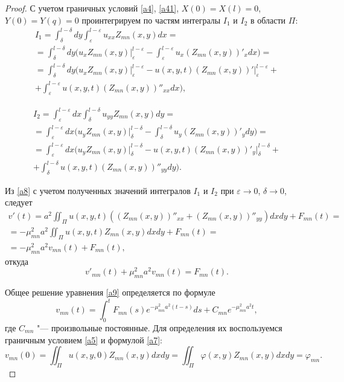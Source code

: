 \begin{proof}
С учетом граничных условий \eqref{a4}, \eqref{a41}, $X(0)=X(l)=0$, $Y(0)=Y(q)=0$ проинтегрируем по частям интегралы $I_1$ и $I_2$ в области $\Pi$:
\begin{multline}
I_{1}=\int_{\delta}^{l-\delta}dy\int_{\varepsilon}^{l-\varepsilon} u_{xx}Z_{mn}(x,y)dx= 
\\
=
\int_{\delta}^{l-\delta} dy\biggl(u_x Z_{mn}(x,y)\big|_{\varepsilon}^{l-\varepsilon}-
\int_{\varepsilon}^{l-\varepsilon}u_x\left(Z_{mn}(x,y)\right)'_x dx\biggr)=
\\
=\int_{\delta}^{l-\delta} dy\biggl(u_x Z_{mn}(x,y)\big|_{\varepsilon}^{l-\varepsilon}-u(x,y,t) \left(Z_{mn}(x,y)\right)'\big|_{\varepsilon}^{l-\varepsilon}+
\\
+ \int_{\varepsilon}^{l-\varepsilon}u(x,y,t)\left(Z_{mn}(x,y)\right)''_{xx} dx\biggr),
\end{multline}

\begin{multline}
I_{2}=\int_{\varepsilon}^{l-\varepsilon}dx\int_{\delta}^{l-\delta} u_{yy} Z_{mn}(x,y)dy= 
\\
=
\int_{\varepsilon}^{l-\varepsilon} dx\biggl(u_y Z_{mn}(x,y)\big|_{\delta}^{l-\delta}-
\int_{\delta}^{l-\delta} u_y\left(Z_{mn}(x,y)\right)'_{y} dy\biggr)  =
\\
=\int_{\varepsilon}^{l-\varepsilon} dx\biggl(u_y Z_{mn}(x,y)\big|_{\delta}^{l-\delta}-
u(x,y,t)\left(Z_{mn}(x,y)\right)'_{y} \big|_{\delta}^{l-\delta}+
\\
+
\int_{\delta}^{l-\delta} u(x,y,t)\left(Z_{mn}(x,y)\right)''_{yy} dy\biggr). 
\end{multline}

Из \eqref{a8}  с учетом полученных значений интегралов $I_{1}$ и $I_{2}$ при $\varepsilon\rightarrow 0$, $\delta\rightarrow 0$, следует
\begin{multline}
v'(t)=a^2\iint_\Pi u(x,y,t)\left(\left(Z_{mn}(x,y)\right)''_{xx}+\left(Z_{mn}(x,y)\right)''_{yy}\right)dxdy+F_{mn}(t)=
\\
=-\mu_{mn}^2a^2\iint_\Pi u(x,y,t)Z_{mn}(x,y)dxdy+F_{mn}(t)=
\\
=-\mu_{mn}^2a^2v_{mn}(t)+F_{mn}(t),
\end{multline}
откуда
\begin{equation}\label{a9}v'_{mn}(t)+\mu_{mn}^2a^2v_{mn}(t)=F_{mn}(t).\end{equation}

Общее решение уравнения \eqref{a9} определяется по формуле
\begin{equation}
\label{b10}
v_{mn}(t)=\int_0^tF_{mn}(s)e^{-\mu_{mn}^2a^2(t-s)}ds+C_{mn}e^{-\mu_{mn}^2a^2t},
\end{equation}
где $C_{mn}$ "--- произвольные постоянные. 
Для определения их воспользуемся граничным условием \eqref{a5} и формулой \eqref{a7}:
\begin{equation}
\label{b11}
v_{mn}(0)=\iint_\Pi u(x,y,0)Z_{mn}(x,y)dxdy=\iint_\Pi \varphi(x,y)Z_{mn}(x,y)dxdy=\varphi_{mn}.
\end{equation}


\end{proof}
